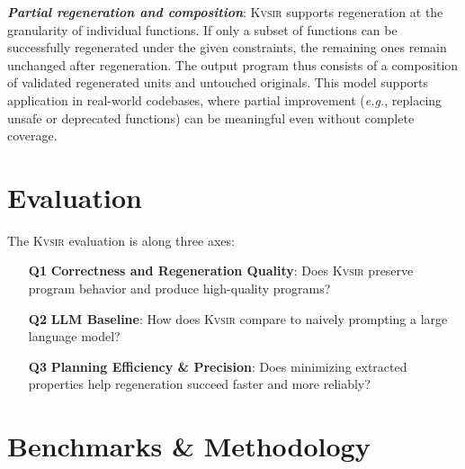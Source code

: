 \documentclass[nonacm,sigplan,review]{acmart}
\def\eg{{\em e.g.}, }
\newcommand{\sys}{{\scshape Kv{\textalpha}sir}\xspace}
\newcommand{\heading}[1]{\vspace{2pt}\noindent\textbf{\emph{#1}}:\enspace}
\begin{document}
\heading{Partial regeneration and composition}
\sys supports regeneration at the granularity of individual functions.
If only a subset of functions can be successfully regenerated under the given constraints, the remaining ones remain unchanged after regeneration.
The output program thus consists of a composition of validated regenerated units and untouched originals.
This model supports application in real-world codebases, where partial improvement (\eg replacing unsafe or deprecated functions) can be meaningful even without complete coverage.

\section{Evaluation}
\label{sec:evaluation}

The \sys evaluation is along three axes:

\begin{itemize}
  \item[\textbf{Q1}] \textbf{Correctness and Regeneration Quality}: Does \sys preserve program behavior and produce high-quality programs?
  \item[\textbf{Q2}] \textbf{LLM Baseline}: How does \sys compare to naively prompting a large language model?
  \item[\textbf{Q3}] \textbf{Planning Efficiency \& Precision}: Does minimizing extracted properties help regeneration succeed faster and more reliably?
\end{itemize}

\section{Benchmarks \& Methodology}
\end{document}
